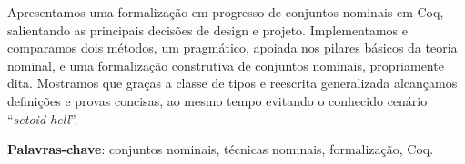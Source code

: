 \documentclass[
	12pt,				%
	oneside,
	a4paper,			%
	english,			%
	brazil				%
	]{abntex2}
\begin{document}
%
%



\setlength{\absparsep}{18pt} %
\begin{resumo}
	Apresentamos uma formalização em progresso de conjuntos nominais em Coq, salientando as principais decisões de design e projeto. Implementamos e comparamos dois métodos, um pragmático, apoiada nos pilares básicos da teoria nominal, e uma formalização construtiva de conjuntos nominais, propriamente dita. Mostramos que graças a classe de tipos e reescrita generalizada alcançamos definições e provas concisas, ao mesmo tempo evitando o conhecido cenário ``\textit{setoid hell}''.

 \textbf{Palavras-chave}: conjuntos nominais, técnicas nominais, formalização, Coq.
\end{resumo}
\end{document}
